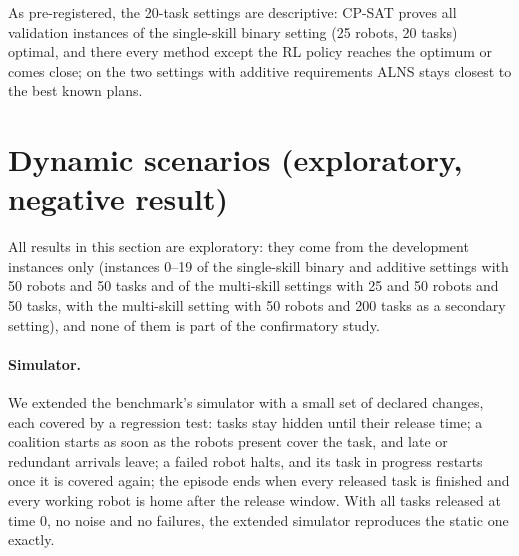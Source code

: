 \documentclass[10pt]{article}
\begin{document}
As pre-registered, the 20-task settings are descriptive: CP-SAT proves all validation instances of the single-skill
binary setting (25 robots, 20 tasks) optimal, and there every method except the RL policy reaches the optimum or comes close; on the
two settings with additive requirements ALNS stays closest to the best known plans.

\section{Dynamic scenarios (exploratory, negative result)}
\label{sec:s-dynamic}

All results in this section are exploratory: they come from the development instances only (instances 0--19 of the
single-skill binary and additive settings with 50 robots and 50 tasks and of the multi-skill settings with 25 and 50
robots and 50 tasks, with the multi-skill setting with 50 robots and 200 tasks as a secondary setting), and none of them is part of the confirmatory study.

\paragraph{Simulator.} We extended the benchmark's simulator with a small set of declared changes, each covered by a
regression test: tasks stay hidden until their release time; a coalition starts as soon as the robots present cover the
task, and late or redundant arrivals leave; a failed robot halts, and its task in progress restarts once it is covered
again; the episode ends when every released task is finished and every working robot is home after the release window.
With all tasks released at time 0, no noise and no failures, the extended simulator reproduces the static one exactly.
\end{document}
